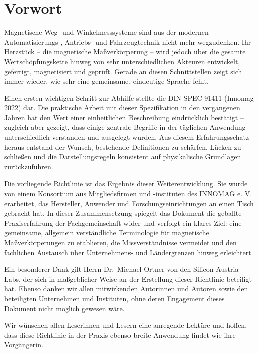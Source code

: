 \documentclass[
  ngerman,
  a4paper,
  twoside]{scrbook}
\makeatletter
\newcommand{\innomag@addcontentsline}[3]{%
  \ifstrequal{#1}{toc}{%
    \ifstrequal{#2}{chapter}{%
      \IfBeginWith{\@currentHref}{chapter.}{}{%
        \phantomsection
      }%
    }{}%
  }{}%
  \innomag@originaladdcontentsline{#1}{#2}{#3}%
}
\let\innomag@originaladdcontentsline\addcontentsline
\let\addcontentsline\innomag@addcontentsline
\makeatother
\begin{document}

\chapter*{Vorwort}\label{vorwort}


Magnetische Weg- und Winkelmesssysteme sind aus der modernen
Automatisierungs-, Antriebs- und Fahrzeugtechnik nicht mehr wegzudenken.
Ihr Herzstück -- die magnetische Maßverkörperung -- wird jedoch über die
gesamte Wertschöpfungskette hinweg von sehr unterschiedlichen Akteuren
entwickelt, gefertigt, magnetisiert und geprüft. Gerade an diesen
Schnittstellen zeigt sich immer wieder, wie sehr eine gemeinsame,
eindeutige Sprache fehlt.

Einen ersten wichtigen Schritt zur Abhilfe stellte die DIN SPEC 91411
(Innomag 2022) dar. Die praktische Arbeit mit dieser Spezifikation in
den vergangenen Jahren hat den Wert einer einheitlichen Beschreibung
eindrücklich bestätigt -- zugleich aber gezeigt, dass einige zentrale
Begriffe in der täglichen Anwendung unterschiedlich verstanden und
ausgelegt wurden. Aus diesem Erfahrungsschatz heraus entstand der
Wunsch, bestehende Definitionen zu schärfen, Lücken zu schließen und die
Darstellungsregeln konsistent auf physikalische Grundlagen
zurückzuführen.

Die vorliegende Richtlinie ist das Ergebnis dieser Weiterentwicklung.
Sie wurde von einem Konsortium aus Mitgliedsfirmen und -instituten des
INNOMAG e. V. erarbeitet, das Hersteller, Anwender und
Forschungseinrichtungen an einen Tisch gebracht hat. In dieser
Zusammensetzung spiegelt das Dokument die geballte Praxiserfahrung der
Fachgemeinschaft wider und verfolgt ein klares Ziel: eine gemeinsame,
allgemein verständliche Terminologie für magnetische Maßverkörperungen
zu etablieren, die Missverständnisse vermeidet und den fachlichen
Austausch über Unternehmens- und Ländergrenzen hinweg erleichtert.

Ein besonderer Dank gilt Herrn Dr.~Michael Ortner von den Silicon
Austria Labs, der sich in maßgeblicher Weise an der Erstellung dieser
Richtlinie beteiligt hat. Ebenso danken wir allen mitwirkenden
Autorinnen und Autoren sowie den beteiligten Unternehmen und Instituten,
ohne deren Engagement dieses Dokument nicht möglich gewesen wäre.

Wir wünschen allen Leserinnen und Lesern eine anregende Lektüre und
hoffen, dass diese Richtlinie in der Praxis ebenso breite Anwendung
findet wie ihre Vorgängerin.
\end{document}
